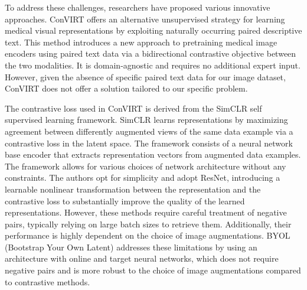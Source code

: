 \documentclass[12pt,twoside,a4paper,parskip]{scrbook} %
\begin{document}
To address these challenges, researchers have proposed various innovative approaches. ConVIRT \cite{zhang2022contrastive} offers an alternative unsupervised strategy for learning medical visual representations by exploiting naturally occurring paired descriptive text. This method introduces a new approach to pretraining medical image encoders using paired text data via a bidirectional contrastive objective between the two modalities. It is domain-agnostic and requires no additional expert input.  However, given the absence of specific paired text data for our image dataset, ConVIRT does not offer a solution tailored to our specific problem.

The contrastive loss used in ConVIRT is derived from the SimCLR \cite{chen2020simple} self supervised learning framework. SimCLR learns representations by maximizing agreement between differently augmented views of the same data example via a contrastive loss in the latent space. The framework consists of a neural network base encoder that extracts representation vectors from augmented data examples. The framework allows for various choices of network architecture without any constraints. The authors opt for simplicity and adopt ResNet, introducing a learnable nonlinear transformation between the representation and the contrastive loss to substantially improve the quality of the learned representations. However, these methods require careful treatment of negative pairs, typically relying on large batch sizes to retrieve them. Additionally, their performance is highly dependent on the choice of image augmentations. BYOL (Bootstrap Your Own Latent) \cite{grill2020bootstrap} addresses these limitations by using an architecture with online and target neural networks, which does not require negative pairs and is more robust to the choice of image augmentations compared to contrastive methods.
\end{document}
